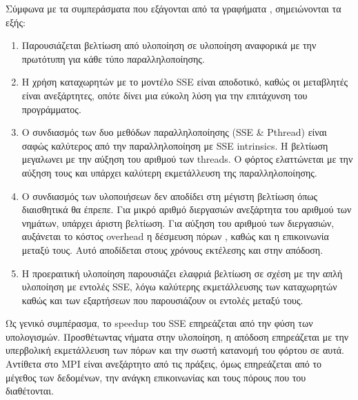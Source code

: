 \documentclass[11pt]{article}
\begin{document}
\vspace{30mm}
Σύμφωνα με τα συμπεράσματα που εξάγονται από τα γραφήματα , σημειώνονται τα εξής:
\begin{enumerate}
\item Παρουσιάζεται βελτίωση από υλοποίηση σε υλοποίηση αναφορικά με την πρωτότυπη για κάθε τύπο παραλληλοποίησης.
\item Η χρήση καταχωρητών με το μοντέλο SSE είναι αποδοτικό, καθώς οι μεταβλητές είναι ανεξάρτητες, οπότε δίνει μια εύκολη λύση για την επιτάχυνση του προγράμματος.
\item Ο συνδιασμός των δυο μεθόδων παραλληλοποίησης (SSE \& Pthread) είναι σαφώς καλύτερος από την παραλληλοποίηση με SSE intrinsics. Η βελτίωση μεγαλωνει με την αύξηση του αριθμού των  threads. Ο φόρτος ελαττώνεται με την αύξηση τους και υπάρχει καλύτερη εκμετάλλευση της παραλληλοποίησης.
\item Ο συνδιασμός των υλοποιήσεων δεν αποδίδει στη μέγιστη βελτίωση όπως διαισθητικά θα έπρεπε. Για μικρό αριθμό διεργασιών ανεξάρτητα του αριθμού των νημάτων, υπάρχει άριστη βελτίωση. Για αύξηση του αριθμού των διεργασιών, αυξάνεται το κόστος overhead  η δέσμευση πόρων , καθώς και η επικοινωνία μεταξύ τους. Αυτό αποδίδεται στους χρόνους εκτέλεσης και στην απόδοση.
\item Η προεραιτική υλοποίηση παρουσιάζει ελαφριά βελτίωση σε σχέση με την απλή υλοποίηση με εντολές  SSE,  λόγω καλύτερης εκμετάλλευσης των καταχωρητών καθώς και των εξαρτήσεων που παρουσιάζουν οι εντολές μεταξύ τους.
\end{enumerate} 

Ως γενικό συμπέρασμα, το speedup  του SSE επηρεάζεται από την φύση των υπολογισμών. Προσθέτωντας νήματα στην υλοποίηση, η απόδοση επηρεάζεται με την υπερβολική εκμετάλλευση των πόρων και την σωστή κατανομή του φόρτου σε αυτά. Αντίθετα στο MPI είναι ανεξάρτητο από τις πράξεις, όμως επηρεάζεται από το μέγεθος των δεδομένων, την ανάγκη επικοινωνίας και τους πόρους που του διαθέτονται.

\vspace{15mm}
\end{document}
